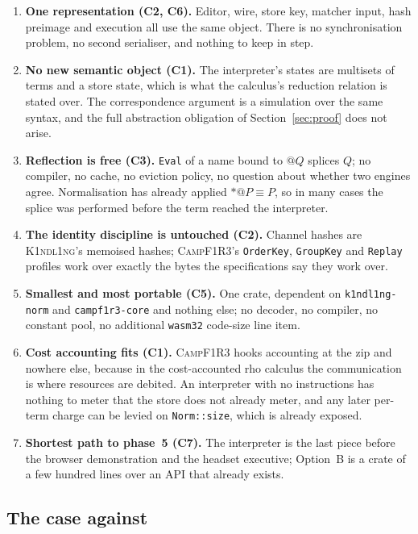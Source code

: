 \documentclass[11pt,a4paper]{article}
\newcommand{\code}[1]{\texttt{#1}}
\newcommand{\Kind}{\textsc{K1ndl1ng}}
\newcommand{\Camp}{\textsc{CampF1R3}}
\theoremstyle{definition}
\theoremstyle{plain}
\begin{document}
\begin{enumerate}[leftmargin=1.8em,nosep]
\item \textbf{One representation (C2, C6).} Editor, wire, store key, matcher
input, hash preimage and execution all use the same object. There is no
synchronisation problem, no second serialiser, and nothing to keep in step.
\item \textbf{No new semantic object (C1).} The interpreter's states are
multisets of terms and a store state, which is what the calculus's reduction
relation is stated over. The correspondence argument is a simulation over the
same syntax, and the full abstraction obligation of Section~\ref{sec:proof} does
not arise.
\item \textbf{Reflection is free (C3).} \code{Eval} of a name bound to $@Q$
splices $Q$; no compiler, no cache, no eviction policy, no question about
whether two engines agree. Normalisation has already applied $*@P\equiv P$, so
in many cases the splice was performed before the term reached the interpreter.
\item \textbf{The identity discipline is untouched (C2).} Channel hashes are
\Kind's memoised hashes; \Camp's \code{OrderKey}, \code{GroupKey} and
\code{Replay} profiles work over exactly the bytes the specifications say they
work over.
\item \textbf{Smallest and most portable (C5).} One crate, dependent on
\code{k1ndl1ng-norm} and \code{campf1r3-core} and nothing else; no decoder, no
compiler, no constant pool, no additional \code{wasm32} code-size line item.
\item \textbf{Cost accounting fits (C1).} \Camp{} hooks accounting at the zip
and nowhere else, because in the cost-accounted rho calculus the communication
is where resources are debited. An interpreter with no instructions has nothing
to meter that the store does not already meter, and any later per-term charge
can be levied on \code{Norm::size}, which is already exposed.
\item \textbf{Shortest path to phase~5 (C7).} The interpreter is the last piece
before the browser demonstration and the headset executive; Option~B is a crate
of a few hundred lines over an API that already exists.
\end{enumerate}

\subsection{The case against}
\end{document}
